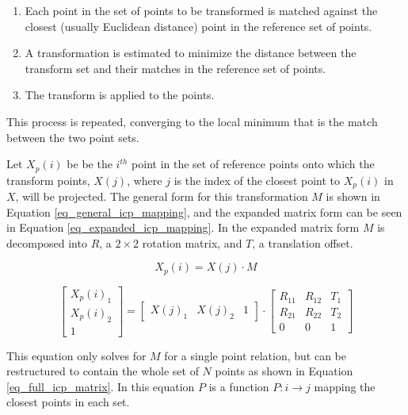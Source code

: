 \documentclass{article}
\begin{document}
\begin{enumerate}
	\item Each point in the set of points to be transformed is matched against the closest (usually Euclidean distance) point in the reference set of points.
	\item A transformation is estimated to minimize the distance between the transform set and their matches in the reference set of points.
	\item The transform is applied to the points.
\end{enumerate}

This process is repeated, converging to the local minimum that is the match between the two point sets.

Let $X_p(i)$ be be the $i^{th}$ point in the set of reference points onto which the transform points, $X(j)$, where $j$ is the index of the closest point to $X_p(i)$ in $X$, will be projected. The general form for this transformation $M$ is shown in Equation \ref{eq_general_icp_mapping}, and the expanded matrix form can be seen in Equation \ref{eq_expanded_icp_mapping}. In the expanded matrix form $M$ is decomposed into $R$, a $2 \times 2$ rotation matrix, and $T$, a translation offset.

\begin{equation}
X_p(i) = X(j) \cdot M
\label{eq_general_icp_mapping}
\end{equation}

\begin{equation}
\begin{bmatrix}
X_p(i)_1 \\
X_p(i)_2 \\
1 
\end{bmatrix}
=
\begin{bmatrix}
X(j)_1 & X(j)_2 & 1
\end{bmatrix}
\cdot
\begin{bmatrix}
R_{11} & R_{12} & T_1 \\
R_{21} & R_{22} & T_2 \\
0 & 0 & 1
\end{bmatrix}
\label{eq_expanded_icp_mapping}
\end{equation}

This equation only solves for $M$ for a single point relation, but can be restructured to contain
the whole set of $N$ points as shown in Equation \ref{eq_full_icp_matrix}. In this equation $P$ is a function $P: i \rightarrow j$ mapping the closest points in each set.
\end{document}
